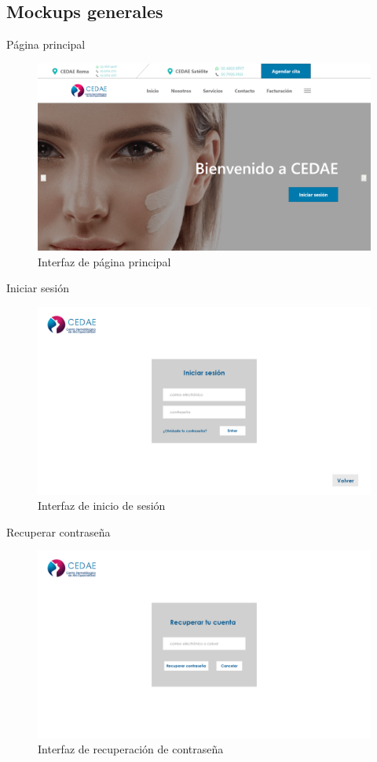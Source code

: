 \documentclass[12pt,letterpaper]{article}
\begin{document}
        \subsection{Mockups generales}
        Página principal
            \begin{figure}[H]
                \centering
                \includegraphics [scale=0.13]{gen_index}
                \caption{Interfaz de página principal}
            \end{figure}
        Iniciar sesión
            \begin{figure}[H]
                \centering
                \includegraphics [scale=0.13]{gen_login}
                \caption{Interfaz de inicio de sesión}
            \end{figure}
        Recuperar contraseña
            \begin{figure}[H]
                \centering
                \includegraphics [scale=0.16]{gen_recovery}
                \caption{Interfaz de recuperación de contraseña}
            \end{figure}
\end{document}
